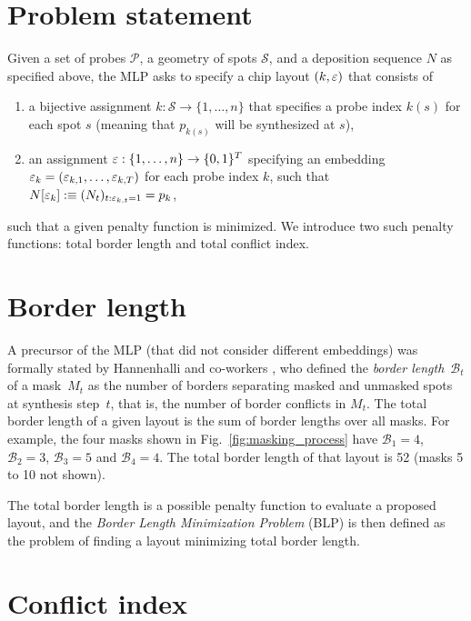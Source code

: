 \section{Problem statement}
\label{sec:mlp_problem}

Given a set of probes $\mathcal{P}$, a geometry of spots $\mathcal{S}$,
and a deposition sequence $N$ as specified above, the MLP asks to
specify a chip layout $(k,\varepsilon)$ that consists of
\begin{enumerate}
\item a bijective assignment $k: \mathcal{S}\to \{1,\dots,n\}$ that
  specifies a probe index $k(s)$ for each spot $s$ (meaning that
  $p_{k(s)}$ will be synthesized at $s$),
\item an assignment $\varepsilon: \{1,\dots,n\}\to \{0,1\}^T$ specifying an
  embedding $\varepsilon_k = (\varepsilon_{k,1},\dots,\varepsilon_{k,T})$ for each
  probe index $k$, such that $N[\varepsilon_k] :\equiv (N_t)_{t:
    \varepsilon_{k,t}=1} = p_k$,
\end{enumerate}
such that a given penalty function is minimized.  We introduce two
such penalty functions: total border length and total conflict index.


\section{Border length}
\label{sec:mlp_border_length}

A precursor of the MLP (that did not consider different embeddings)
was formally stated by Hannenhalli and co-workers \citep{Hannenhalli2002},
who defined
the \emph{border length}~$\mathcal{B}_t$ of a mask~$M_{t}$ as the
number of borders separating masked and unmasked spots at synthesis
step~$t$, that is, the number of border
conflicts in $M_{t}$. The total border length of a given layout is the
sum of border lengths over all masks. For example, the four masks
shown in Fig.~\ref{fig:masking_process} have $\mathcal{B}_1 = 4$,
$\mathcal{B}_2 = 3$, $\mathcal{B}_3 = 5$ and $\mathcal{B}_4 = 4$. The
total border length of that layout is 52 (masks 5 to 10 not shown).

The total border length is a possible penalty function to evaluate a
proposed layout, and the \emph{Border Length Minimization Problem}
(BLP) is then defined as the problem of finding a layout minimizing
total border length.


\section{Conflict index}
\label{sec:mlp_conflict_index}

